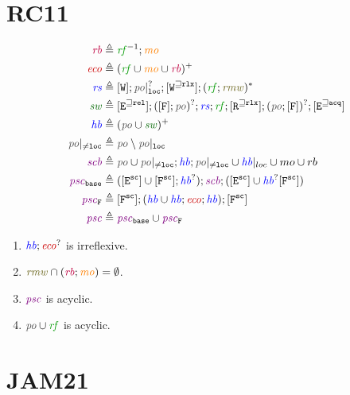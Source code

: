 \documentclass{article}
\begin{document}
\section{RC11}

\begin{align*}
    \rb &\defeq \rf^{-1} ; \mo  \\
    \eco &\defeq (\rf \cup \mo \cup \rb)^+ \\
    \rs &\defeq [\lW]; \po|_{\loc}^?; [\lW^{\sqslq \rlx}]; (\rf; \rmw)^*  \\
    \sw &\defeq [\lE^{\sqslq \rel}]; ([\lF]; \po)^?; \rs; \rf; [\lR^{\sqslq \rlx}]; (\po; [\lF])^?; [\lE^{\sqslq \acq}] \\
    \hb &\defeq (\po \cup \sw)^+ \\
    \poneqloc &\defeq \po \setminus \po|_{\loc} \\
    \scb &\defeq \po \cup \poneqloc ; \hb ; \poneqloc \cup \hb|_{loc}
    \cup mo \cup rb \\
    \pscbase &\defeq ([\lE^\sco] \cup [\lF^\sco] ; \hb^?) ; \scb ; ([\lE^\sco] \cup \hb^? [\lF^\sco]) \\
    \pscf &\defeq [\lF^\sco] ; (\hb \cup \hb;\eco;\hb) ; [\lF^\sco] \\
    \psc &\defeq \pscbase \cup \pscf
\end{align*}

\begin{enumerate}
    \item $\hb ; \eco^?$ is irreflexive. 
    \item $\rmw \cap (\rb ; \mo) = \emptyset$. 
    \item $\psc$ is acyclic. 
    \item $\po \cup \rf$ is acyclic.
\end{enumerate}

\section{JAM21}

\end{document}
